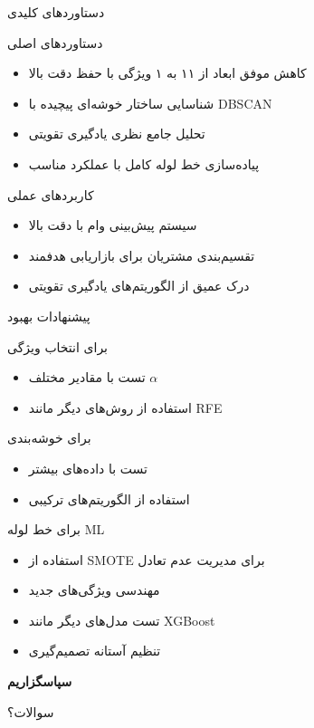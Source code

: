 \documentclass[aspectratio=169]{beamer}
\begin{document}
\begin{frame}{دستاوردهای کلیدی}
\begin{block}{دستاوردهای اصلی}
\begin{itemize}
\item کاهش موفق ابعاد از ۱۱ به ۱ ویژگی با حفظ دقت بالا
\item شناسایی ساختار خوشه‌ای پیچیده با DBSCAN
\item تحلیل جامع نظری یادگیری تقویتی
\item پیاده‌سازی خط لوله کامل با عملکرد مناسب
\end{itemize}
\end{block}

\begin{block}{کاربردهای عملی}
\begin{itemize}
\item سیستم پیش‌بینی وام با دقت بالا
\item تقسیم‌بندی مشتریان برای بازاریابی هدفمند
\item درک عمیق از الگوریتم‌های یادگیری تقویتی
\end{itemize}
\end{block}
\end{frame}

\begin{frame}{پیشنهادات بهبود}
\begin{block}{برای انتخاب ویژگی}
\begin{itemize}
\item تست با مقادیر مختلف $\alpha$
\item استفاده از روش‌های دیگر مانند RFE
\end{itemize}
\end{block}

\begin{block}{برای خوشه‌بندی}
\begin{itemize}
\item تست با داده‌های بیشتر
\item استفاده از الگوریتم‌های ترکیبی
\end{itemize}
\end{block}

\begin{block}{برای خط لوله ML}
\begin{itemize}
\item استفاده از SMOTE برای مدیریت عدم تعادل
\item مهندسی ویژگی‌های جدید
\item تست مدل‌های دیگر مانند XGBoost
\item تنظیم آستانه تصمیم‌گیری
\end{itemize}
\end{block}
\end{frame}

\begin{frame}
\begin{center}
\Huge \textbf{سپاسگزاریم}

\vspace{1cm}

\Large سوالات؟
\end{center}
\end{frame}
\end{document}
